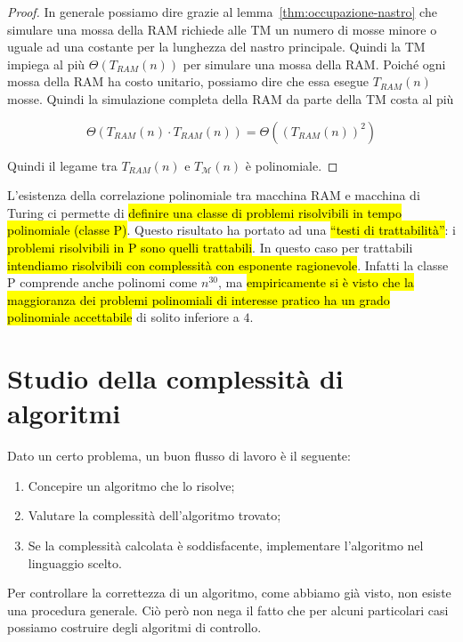 \documentclass[a4paper,11pt,oneside]{article}
\theoremstyle{plain}
\theoremstyle{definition}
\theoremstyle{remark}
\begin{document}
\begin{proof}
  In generale possiamo dire grazie al lemma~\ref{thm:occupazione-nastro} che %
  simulare una mossa della RAM richiede alle TM un numero di mosse minore o
  uguale ad una costante per la lunghezza del nastro principale. Quindi la TM
  impiega al più $\Theta(T_{RAM}(n))$ per simulare una mossa della RAM\@. Poiché
  ogni mossa della RAM ha costo unitario, possiamo dire che essa esegue
  $T_{RAM}(n)$ mosse. Quindi la simulazione completa della RAM da parte della TM
  costa al più

  \[
    \Theta(T_{RAM}(n) \cdot T_{RAM}(n)) = \Theta({(T_{RAM}(n))}^2)
  \]

  Quindi il legame tra $T_{RAM}(n)$ e $T_\mathcal{M}(n)$ è polinomiale.
\end{proof}

L'esistenza della correlazione polinomiale tra macchina RAM e macchina di Turing
ci permette di \hl{definire una classe di problemi risolvibili in tempo
polinomiale (classe P)}. Questo risultato ha portato ad una \hl{``testi di
trattabilità''}: i \hl{problemi risolvibili in P sono quelli trattabili}. In
questo caso per trattabili \hl{intendiamo risolvibili con complessità con
esponente ragionevole}. Infatti la classe P comprende anche polinomi come
$n^{30}$, ma \hl{empiricamente si è visto che la maggioranza dei problemi
polinomiali di interesse pratico ha un grado polinomiale accettabile} di solito
inferiore a $4$.

\section{Studio della complessità di algoritmi}\label{sec:comp-alg}

Dato un certo problema, un buon flusso di lavoro è il seguente:

\begin{enumerate}
  \item Concepire un algoritmo che lo risolve;
  \item Valutare la complessità dell'algoritmo trovato;
  \item Se la complessità calcolata è soddisfacente, implementare l'algoritmo
    nel linguaggio scelto.
\end{enumerate}

Per controllare la correttezza di un algoritmo, come abbiamo già visto, non
esiste una procedura generale. Ciò però non nega il fatto che per alcuni
particolari casi possiamo costruire degli algoritmi di controllo.
\end{document}
